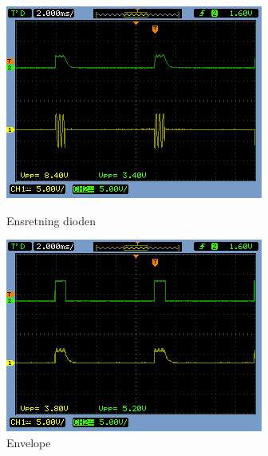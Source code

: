 \begin{figure}[H]
  \begin{minipage}{0.45\textwidth}
    \centering
	\includegraphics[width=\textwidth]{billeder/HWTest/Decoder/Decoder_ensretning}
		\caption{Ensretning dioden}
	\label{fig:Decoder_diode}
  \end{minipage}
  \hspace{0.1\textwidth}
  \begin{minipage}{0.45\textwidth}
    \centering
	\includegraphics[width=\textwidth]{billeder/HWTest/Decoder/Decoder_envelope}
		\caption{Envelope}
	\label{fig:Decoder_envelope}
  \end{minipage}
\end{figure}

